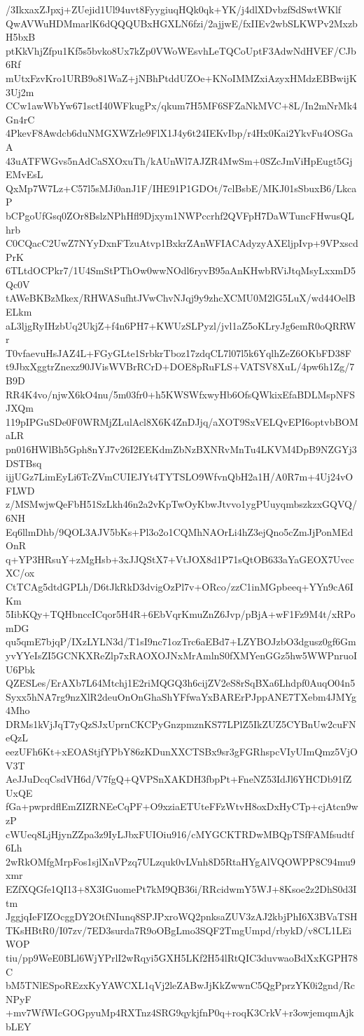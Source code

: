 /3IkxaxZJpxj+ZUejid1Ul94uvt8FyygiuqHQk0qk+YK/j4dlXDvbzfSdSwtWKlf
QwAVWuHDMmarlK6dQQQUBxHGXLN6fzi/2ajjwE/fxIIEv2wbSLKWPv2MxzbH5bxB
ptKkVhjZfpu1Kf5s5bvko8Ux7kZp0VWoWEsvhLeTQCoUptF3AdwNdHVEF/CJb6Rf
mUtxFzvKro1URB9o81WaZ+jNBhPtddUZOe+KNoIMMZxiAzyxHMdzEBBwijK3Uj2m
CCw1awWbYw671sctI40WFkugPx/qkum7H5MF6SFZaNkMVC+8L/In2mNrMk4Gn4rC
4PkevF8Awdcb6duNMGXWZrle9FlX1J4y6t24IEKvIbp/r4Hx0Kai2YkvFu4OSGaA
43uATFWGvs5nAdCaSXOxuTh/kAUnWl7AJZR4MwSm+0SZcJmViHpEugt5GjEMvEsL
QxMp7W7Lz+C57l5sMJi0anJ1F/IHE91P1GDOt/7clBsbE/MKJ01sSbuxB6/LkcaP
bCPgoUfGsq0ZOr8BslzNPhHfl9Djxym1NWPccrhf2QVFpH7DaWTuncFHwusQLhrb
C0CQacC2UwZ7NYyDxnFTzuAtvp1BxkrZAnWFIACAdyzyAXEljpIvp+9VPxscdPrK
6TLtdOCPkr7/1U4SmStPThOw0wwNOdl6ryvB95aAnKHwbRViJtqMsyLxxmD5Qc0V
tAWeBKBzMkex/RHWASufhtJVwChvNJqj9y9zhcXCMU0M2lG5LuX/wd44OelBELkm
aL3ljgRyIHzbUq2UkjZ+f4n6PH7+KWUzSLPyzl/jvl1aZ5oKLryJg6emR0oQRRWr
T0vfaevuHsJAZ4L+FGyGLte1SrbkrTboz17zdqCL7l07l5k6YqlhZeZ6OKbFD38F
t9JbxXggtrZnexz90JVisWVBrRCrD+DOE8pRuFLS+VATSV8XuL/4pw6h1Zg/7B9D
RR4K4vo/njwX6kO4nu/5m03fr0+h5KWSWfxwyHb6OfsQWkixEfaBDLMspNFSJXQm
119pIPGuSDe0F0WRMjZLulAcl8X6K4ZnDJjq/aXOT9SxVELQvEPI6optvbBOMaLR
pn016HWlBh5Gph8nYJ7v26I2EEKdmZbNzBXNRvMnTu4LKVM4DpB9NZGYj3DSTBsq
ijjUGz7LimEyLi6TcZVmCUIEJYt4TYTSLO9WfvnQbH2a1H/A0R7m+4Uj24vOFLWD
z/MSMwjwQeFbH51SzLkh46n2a2vKpTwOyKbwJtvvo1ygPUuyqmbszkzxGQVQ/6NH
Eq6llmDhb/9QOL3AJV5bKs+Pl3o2o1CQMhNAOrLi4hZ3ejQno5cZmJjPonMEdOnR
q+YP3HRsuY+zMgHsb+3xJJQStX7+VtJOX8d1P71sQtOB633aYaGEOX7UvccXC/ox
CtTCAg5dtdGPLh/D6tJkRkD3dvigOzPl7v+ORco/zzC1inMGpbeeq+YYn9cA6IKm
5IibKQy+TQHbnccICqor5H4R+6EbVqrKmuZnZ6Jvp/pBjA+wF1Fz9M4t/xRPomDG
qu5qmE7bjqP/IXzLYLN3d/T1sI9nc71ozTrc6aEBd7+LZYBOJzbO3dgusz0gf6Gm
yvYYeIsZI5GCNKXReZlp7xRAOXOJNxMrAmlnS0fXMYenGGz5hw5WWPnruoIU6Pbk
QZESLes/ErAXb7L64Mtchj1E2riMQGQ3h6cijZV2eS8rSqBXa6Lhdpf0AuqO04n5
Syxx5hNA7rg9nzXlR2deuOnOnGhaShYFfwaYxBARErPJppANE7TXebm4JMYg4Mho
DRMs1kVjJqT7yQzSJxUprnCKCPyGnzpmznKS77LPlZ5IkZUZ5CYBnUw2cuFNeQzL
eezUFh6Kt+xEOAStjfYPbY86zKDunXXCTSBx9sr3gFGRhspcVIyUImQmz5VjOV3T
AeJJuDcqCsdVH6d/V7fgQ+QVPSnXAKDH3fbpPt+FneNZ53IdJl6YHCDb91fZUxQE
fGa+pwprdflEmZIZRNEeCqPF+O9xziaETUteFFzWtvH8oxDxHyCTp+cjAtcn9wzP
cWUeq8LjHjynZZpa3z9IyLJbxFUIOiu916/cMYGCKTRDwMBQpTSfFAMfsudtf6Lh
2wRkOMfgMrpFos1sjlXnVPzq7ULzquk0vLVnh8D5RtaHYgAlVQOWPP8C94mu9xmr
EZfXQGfe1QI13+8X3IGuomePt7kM9QB36i/RRcidwmY5WJ+8Ksoe2z2DhS0d3Itm
JggjqIeFIZOcggDY2OtfNIunq8SPJPxroWQ2pnksaZUV3zAJ2kbjPhI6X3BVaTSH
TKsHBtR0/I07zv/7ED3surda7R9oOBgLmo3SQF2TmgUmpd/rbykD/v8CL1LEiWOP
tiu/pp9WeE0BLl6WjYPrlI2wRqyi5GXH5LKf2H54lRtQIC3duvwaoBdXxKGPH78C
bM5TNlESpoREzxKyYAWCXL1qVj2leZABwJjKkZwwnC5QgPprzYK0i2gnd/RcNPyF
+mv7WfWIcGOGpyuMp4RXTnz4SRG9qykjfnP0q+roqK3CrkV+r3owjemqmAjkbLEY
